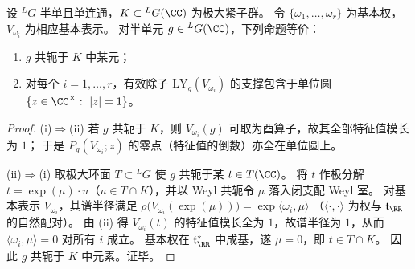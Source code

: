 \begin{theorem}\label{thm:xi-leyang-compactness-by-fundamental-circle}
设 \({}^{L}G\) 半单且单连通，\(K\subset {}^{L}G(\CC)\) 为极大紧子群。
令 \(\{\omega_1,\dots,\omega_r\}\) 为基本权，\(V_{\omega_i}\) 为相应基本表示。
对半单元 \(g\in {}^{L}G(\CC)\)，下列命题等价：
\begin{enumerate}
  \item \(g\) 共轭于 \(K\) 中某元；
  \item 对每个 \(i=1,\dots,r\)，有效除子 \(\mathrm{LY}_g(V_{\omega_i})\) 的支撑包含于单位圆 \(\{z\in\CC^{\times}:\ |z|=1\}\)。
\end{enumerate}
\end{theorem}
\begin{proof}
(i)\(\Rightarrow\)(ii) 若 \(g\) 共轭于 \(K\)，则 \(V_{\omega_i}(g)\) 可取为酉算子，故其全部特征值模长为 \(1\)；
于是 \(P_g(V_{\omega_i};z)\) 的零点（特征值的倒数）亦全在单位圆上。
\par
(ii)\(\Rightarrow\)(i) 取极大环面 \(T\subset {}^{L}G\) 使 \(g\) 共轭于某 \(t\in T(\CC)\)。
将 \(t\) 作极分解 \(t=\exp(\mu)\cdot u\)（\(u\in T\cap K\)），并以 Weyl 共轭令 \(\mu\) 落入闭支配 Weyl 室。
对基本表示 \(V_{\omega_i}\)，其谱半径满足
\(
\rho\bigl(V_{\omega_i}(\exp(\mu))\bigr)=\exp\langle\omega_i,\mu\rangle
\)
（\(\langle\cdot,\cdot\rangle\) 为权与 \(\mathfrak t_{\RR}\) 的自然配对）。
由 (ii) 得 \(V_{\omega_i}(t)\) 的特征值模长全为 \(1\)，故谱半径为 \(1\)，从而 \(\langle\omega_i,\mu\rangle=0\) 对所有 \(i\) 成立。
基本权在 \(\mathfrak t_{\RR}^{\ast}\) 中成基，遂 \(\mu=0\)，即 \(t\in T\cap K\)。
因此 \(g\) 共轭于 \(K\) 中元素。证毕。
\end{proof}

